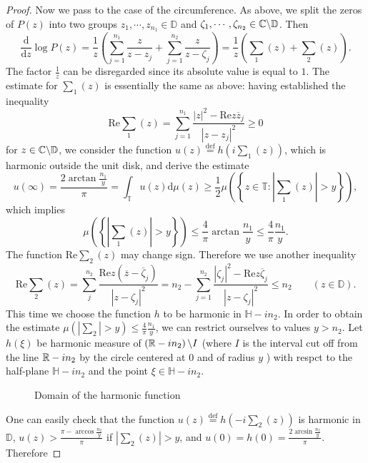 \begin{proof}
Now we pass to the case of the circumference. As above, we split the zeros of $P(z)$ into two groups $z_1,\cdots,z_{n_1}\in \mathbb{D}$ and $\zeta_1,\cdots,\zeta_{n_2}\in \mathbb{C} \backslash \mathbb{D}$. Then 
\[
  \frac{\mathrm{d}}{\mathrm{d}z}\log P(z) = \frac{1}{z}\left( \sum_{j=1}^{n_1} \frac{z}{z-z_j}+\sum_{j=1}^{n_2} \frac{z}{z-\zeta_j} \right) =\frac{1}{z}\left( \sum_1(z)+\sum_2(z) \right) .
\] 
The factor $\frac{1}{z}$ can be disregarded since its absolute value is equal to $1$. The estimate for $\sum_1 (z)$ is essentially the same as above: having established the inequality 
\[
  \mathrm{Re} \sum_{1}^{} (z)=\sum_{j=1}^{n_1} \frac{\left| z \right| ^2-\mathrm{Re}z \overline{z}_j}{\left| z-z_j \right| ^2}\ge 0
\] 
for $z\in \mathbb{C}\backslash \mathbb{D}$, we consider the function $u(z)\overset{\mathrm{def}}{=} h\left( i\sum_1(z) \right) $, which is harmonic outside the unit disk, and derive the estimate
\[
  u(\infty)= \frac{2\arctan \frac{n_1}{y}}{\pi}=\int_{\mathbb{T}}u(z)\mathrm{d}\mu(z)\ge \frac{1}{2}\mu\left( \left\{ z\in \mathbb{T}:\left| \sum_1(z) \right| >y \right\}  \right) ,
\] 
which implies 
\[
  \mu\left( \left\{ \left| \sum_1(z) \right| >y \right\}  \right) \le \frac{4}{\pi}\arctan \frac{n_1}{y}\le \frac{4}{\pi} \frac{n_1}{y}.
\] 
The function $\mathrm{Re} \sum_2(z)$ may change sign. Therefore we use another inequality
\[
  \mathrm{Re} \sum_{2}(z)= \sum_{j}^{n_2} \frac{\mathrm{Re}z(\overline{z}-\overline{\zeta}_j)}{\left| z-\zeta_j \right| ^2} =n_2-\sum_{j=1}^{n_2} \frac{\left| \zeta_j \right| ^2-\mathrm{Re}z \overline{\zeta}_j}{\left| z-\zeta_j \right| ^2}\le  n_2\qquad (z\in \mathbb{D}).
\] 
This time we choose the function $h$ to be harmonic in $\mathbb{H}-in_2$. In order to obtain the estimate $\mu\left( \left| \sum_2 \right| >y \right) \le \frac{4}{\pi}\frac{n_1}{y}$, we can restrict ourselves to values $y>n_2$. Let $h(\xi)$ be harmonic measure of $\left( \mathbb{R}-in_2 \right) \backslash I$ (where $I$ is the interval cut off from the line $\mathbb{R}-in_2$ by the circle centered at $0$ and of radius $y$ ) with respct to the half-plane $\mathbb{H}-in_2$ and the point $\xi \in  \mathbb{H}-in_2$.
\begin{figure}[ht]
    \centering
    \caption{Domain of the harmonic function}
    \label{fig:harmonic-function-3}
\end{figure}
One can easily check that the function $u(z)\overset{\mathrm{def}}{=}h\left( -i\sum_2(z) \right) $ is harmonic in $\mathbb{D}$,  $u(z)> \frac{\pi-\arccos \frac{n_2}{y}}{\pi}$ if $\left| \sum_{2}(z) \right| >y$, and $u(0)=h(0)= \frac{2\arcsin \frac{n_2}{y}}{\pi}$. Therefore

\end{proof}
